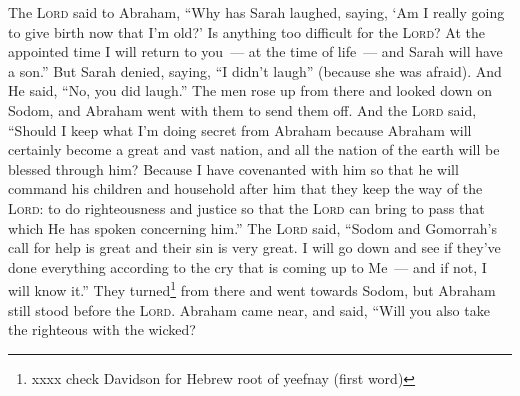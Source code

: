 \begin{inparaenum}
     The \textsc{Lord} said to Abraham, ``Why has Sarah laughed, saying, `Am I really going to give birth now that I'm old?'%
     Is anything too difficult for the \textsc{Lord}? At the appointed time I will return to you~--- at the time of life~--- and Sarah will have a son.''%
     But Sarah denied, saying, ``I didn't laugh'' (because she was afraid). And He said, ``No, you did laugh.''%
     The men rose up from there and looked down on Sodom, and Abraham went with them to send them off.%
     And the \textsc{Lord} said, ``Should I keep what I'm doing secret from Abraham%
     because Abraham will certainly become a great and vast nation, and all the nation of the earth will be blessed through him?%
     Because I have covenanted with him so that he will command his children and household after him that they keep the way of the \textsc{Lord}: to do righteousness and justice so that the \textsc{Lord} can bring to pass that which He has spoken concerning him.''%
     The \textsc{Lord} said, ``Sodom and Gomorrah's call for help is great and their sin is very great.%
     I will go down and see if they've done everything according to the cry that is coming up to Me~--- and if not, I will know it.''%
     They turned\footnote{xxxx check Davidson for Hebrew root of yeefnay (first word)} from there and went towards Sodom, but Abraham still stood before the \textsc{Lord}.%
     Abraham came near, and said, ``Will you also take the righteous with the wicked?%

\end{inparaenum}

